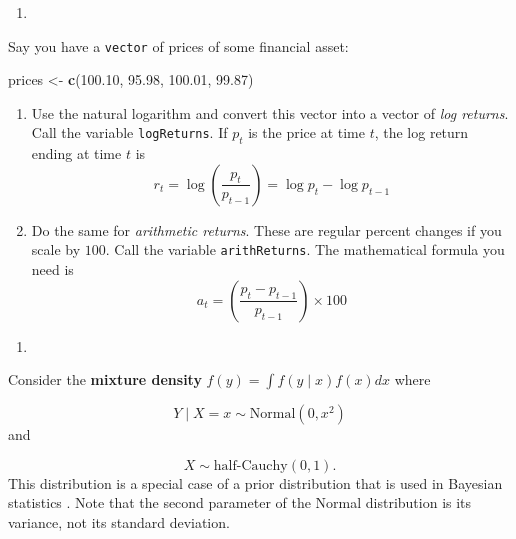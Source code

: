 \documentclass[12pt,krantz2]{krantz}
\makeatletter
\newenvironment{Shaded}{\begin{snugshade}}{\end{snugshade}}
\newcommand{\FloatTok}[1]{\textcolor[rgb]{0.06,0.06,0.06}{#1}}
\newcommand{\KeywordTok}[1]{\textcolor[rgb]{0.27,0.27,0.27}{\textbf{#1}}}
\newcommand{\NormalTok}[1]{#1}
\newcommand{\StringTok}[1]{\textcolor[rgb]{0.5,0.5,0.5}{#1}}
\newenvironment{kframe}{%
\medskip{}
\setlength{\fboxsep}{.8em}
 \def\at@end@of@kframe{}%
 \ifinner\ifhmode%
  \def\at@end@of@kframe{\end{minipage}}%
  \begin{minipage}{\columnwidth}%
 \fi\fi%
 \def\FrameCommand##1{\hskip\@totalleftmargin \hskip-\fboxsep
 \colorbox{shadecolor}{##1}\hskip-\fboxsep
     \hskip-\linewidth \hskip-\@totalleftmargin \hskip\columnwidth}%
 \MakeFramed {\advance\hsize-\width
   \@totalleftmargin\z@ \linewidth\hsize
   \@setminipage}}%
 {\par\unskip\endMakeFramed%
 \at@end@of@kframe}
\renewenvironment{Shaded}{\begin{kframe}}{\end{kframe}}
\makeatother
\begin{document}
\begin{enumerate}
\def\labelenumi{\arabic{enumi}.}
\setcounter{enumi}{4}
\item
\end{enumerate}

Say you have a \texttt{vector} of prices of some financial asset:

\begin{Shaded}
\begin{Highlighting}[]
\NormalTok{prices <-}\StringTok{ }\KeywordTok{c}\NormalTok{(}\FloatTok{100.10}\NormalTok{, }\FloatTok{95.98}\NormalTok{, }\FloatTok{100.01}\NormalTok{, }\FloatTok{99.87}\NormalTok{)}
\end{Highlighting}
\end{Shaded}

\begin{enumerate}
\def\labelenumi{\alph{enumi})}
\item
  Use the natural logarithm and convert this vector into a vector of \emph{log returns}. Call the variable \texttt{logReturns}. If \(p_t\) is the price at time \(t\), the log return ending at time \(t\) is
  \begin{equation} 
  r_t = \log \left( \frac{p_t}{p_{t-1}} \right) = \log p_t - \log p_{t-1}
  \end{equation}
\item
  Do the same for \emph{arithmetic returns}. These are regular percent changes if you scale by \(100\). Call the variable \texttt{arithReturns}. The mathematical formula you need is
  \begin{equation} 
  a_t = \left( \frac{p_t - p_{t-1} }{p_{t-1}} \right) \times 100 
  \end{equation}
\end{enumerate}

\begin{enumerate}
\def\labelenumi{\arabic{enumi}.}
\setcounter{enumi}{5}
\item
\end{enumerate}

Consider the \textbf{mixture density} \(f(y) = \int f(y \mid x) f(x) dx\) where

\begin{equation} 
Y \mid X = x \sim \text{Normal}(0, x^2)
\end{equation}
and

\begin{equation} 
X \sim \text{half-Cauchy}(0, 1).
\end{equation}
This distribution is a special case of a prior distribution that is used in Bayesian statistics \citep{horseshoe}. Note that the second parameter of the Normal distribution is its variance, not its standard deviation.
\end{document}
